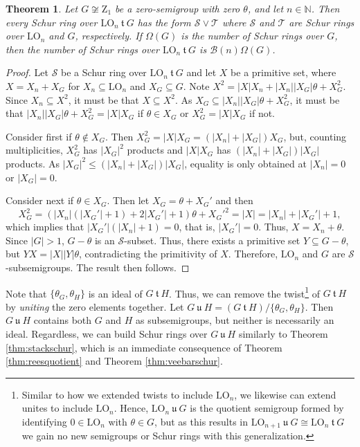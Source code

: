 \documentclass{article}
\theoremstyle{plain}
\newtheorem{Thm}{Theorem}[section]
\theoremstyle{definition}
\newcommand{\thmref}[1]{Theorem \ref{#1}}
\renewcommand{\S}{\mathcal{S}}
\newcommand{\T}{\mathcal{T}}
\newcommand{\N}{\mathbb{N}}
\newcommand{\B}{\mathscr{B}}
\newcommand{\LO}{\mathrm{LO}}
\newcommand{\z}{\mathrm{Z}}
\renewcommand{\t}{\ \mathfrak{t}\ }
\renewcommand{\u}{\ \mathfrak{u}\ }
\begin{document}
\begin{Thm} Let $G \not\cong\z_1$ be a zero-semigroup with zero $\theta$, and let $n\in \N$. Then every Schur ring over $\LO_n\t G$ has the form $\S\vee\T$ where $\S$ and $\T$ are Schur rings over $\LO_n$ and $G$, respectively. If $\Omega(G)$ is the number of Schur rings over $G$, then the number of Schur rings over $\LO_n\t G$ is $\B(n)\Omega(G)$.
\end{Thm}
\begin{proof}
    Let $\S$ be a Schur ring over $\LO_n\t G$ and let $X$ be a primitive set, where $X= X_n+X_G$ for $X_n\subseteq \LO_n$ and $X_G\subseteq G$. Note $X^2 = |X|X_n+ |X_n||X_G|\theta + X_G^2$. Since $X_n\subseteq X^2$, it must be that $X\subseteq X^2$. As $X_G\subseteq |X_n||X_G|\theta+X_G^2$, it must be that $|X_n||X_G|\theta + X_G^2 = |X|X_G$ if $\theta\in X_G$ or $X_G^2=|X|X_G$ if not. 
    
    Consider first if $\theta\notin X_G$. Then $X_G^2=|X|X_G = (|X_n|+|X_G|)X_G$, but, counting multiplicities, $X_G^2$ has $|X_G|^2$ products and $|X|X_G$ has $(|X_n|+|X_G|)|X_G|$ products. As $|X_G|^2 \le (|X_n|+|X_G|)|X_G|$, equality is only obtained at $|X_n|=0$ or $|X_G|=0$. 
    
    Consider next if $\theta \in X_G$. Then let $X_G=\theta+X_G'$ and then \[X_G^2 = (|X_n|(|X_G'|+1) +2|X_G'|+1)\theta + X_G'^2 = |X| = |X_n| + |X_G'|+1,\] which implies that $|X_G'|(|X_n|+1)=0$, that is, $|X_G'|=0$. Thus, $X=X_n+\theta$. Since $|G|>1$, $G-\theta$ is an $\S$-subset. Thus, there exists a primitive set $Y\subseteq G-\theta$, but $YX = |X||Y|\theta$, contradicting the primitivity of $X$. Therefore, $\LO_n$ and $G$ are $\S$-subsemigroups. The result then follows.
\end{proof}

Note that $\{\theta_G,\theta_H\}$ is an ideal of $G\t H$. Thus, we can remove the twist\footnote{Similar to how we extended twists to include $\LO_n$, we likewise can extend unites to include $\LO_n$. Hence, \label{semiunite}$\LO_n\u G$ is the quotient semigroup formed by identifying $0\in \LO_n$ with $\theta\in G$, but as this results in $\LO_{n+1}\u G\cong \LO_n\t G$ we gain no new semigroups or Schur rings with this generalization.} of $G\t H$ by \emph{uniting} the zero elements together. Let \label{unite}$G\u H = (G\t H)/\{\theta_G,\theta_H\}$. Then $G\u H$ contains both $G$ and $H$ as subsemigroups, but neither is necessarily an ideal. Regardless, we can build Schur rings over $G\u H$ similarly to \thmref{thm:stackschur}, which is an immediate consequence of \thmref{thm:reesquotient} and \thmref{thm:veebarschur}.
\end{document}
